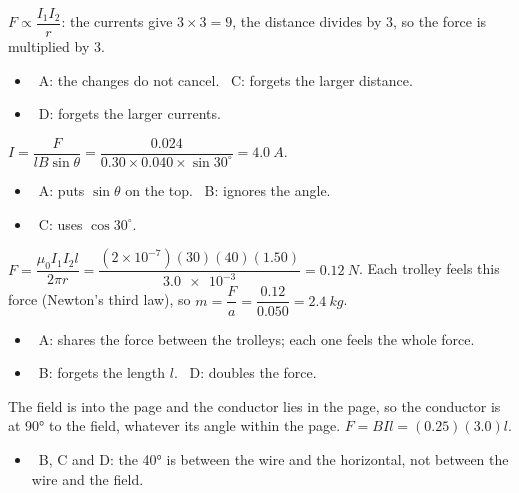 \documentclass[12pt]{article}
\begin{document}
\begin{practiceanswers}
\begin{practiceans}
  $F \propto \dfrac{I_1 I_2}{r}$: the currents give $3 \times 3 = 9$, the distance divides by 3, so the
  force is multiplied by 3.
  \begin{itemize}
    \item \xmark\ A: the changes do not cancel. \quad \xmark\ C: forgets the larger distance.
    \item \xmark\ D: forgets the larger currents.
  \end{itemize}
\end{practiceans}

\begin{practiceans}
  $I = \dfrac{F}{lB\sin\theta} = \dfrac{0.024}{0.30 \times 0.040 \times \sin 30^\circ} = \qty{4.0}{A}$.
  \begin{itemize}
    \item \xmark\ A: puts $\sin\theta$ on the top. \quad \xmark\ B: ignores the angle.
    \item \xmark\ C: uses $\cos 30^\circ$.
  \end{itemize}
\end{practiceans}

\begin{practiceans}
  $F = \dfrac{\mu_0 I_1 I_2 l}{2\pi r} = \dfrac{(2\times10^{-7})(30)(40)(1.50)}{\num{3.0e-3}} = \qty{0.12}{N}$.
  Each trolley feels this force (Newton's third law), so $m = \dfrac{F}{a} = \dfrac{0.12}{0.050} = \qty{2.4}{kg}$.
  \begin{itemize}
    \item \xmark\ A: shares the force between the trolleys; each one feels the whole force.
    \item \xmark\ B: forgets the length $l$. \quad \xmark\ D: doubles the force.
  \end{itemize}
\end{practiceans}

\begin{practiceans}
  The field is into the page and the conductor lies in the page, so the conductor is at \ang{90} to the
  field, whatever its angle within the page. $F = BIl = (0.25)(3.0)l$.
  \begin{itemize}
    \item \xmark\ B, C and D: the \ang{40} is between the wire and the horizontal, not between the wire
          and the field.
  \end{itemize}
\end{practiceans}


\end{practiceanswers}
\end{document}
